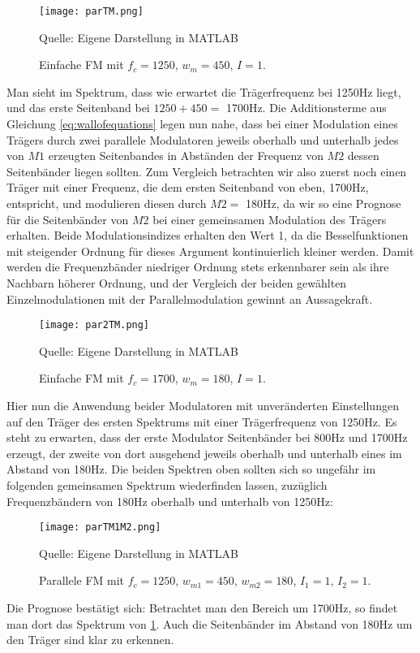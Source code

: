 \FloatBarrier
\begin{figure} [ht]
\centering
  \texttt{[image: parTM.png]}
\caption{Einfache FM mit $f_c = 1250$, $w_m = 450$, $I = 1$. }
Quelle: Eigene Darstellung in MATLAB
\end{figure}
\FloatBarrier
Man sieht im Spektrum, dass wie erwartet die Trägerfrequenz bei 1250Hz liegt, und das erste Seitenband bei $ 1250 + 450 =$ 1700Hz. Die Additionsterme aus Gleichung \ref{eq:wallofequations} legen nun nahe, dass bei einer Modulation eines Trägers durch zwei parallele Modulatoren jeweils oberhalb und unterhalb jedes von $M1$ erzeugten Seitenbandes in Abständen der Frequenz von $M2$ dessen Seitenbänder liegen sollten. Zum Vergleich betrachten wir also zuerst noch einen Träger mit einer Frequenz, die dem ersten Seitenband von eben, 1700Hz, entspricht, und modulieren diesen durch $M2 =$ 180Hz, da wir so eine Prognose für die Seitenbänder von $M2$ bei einer gemeinsamen Modulation des Trägers erhalten. Beide Modulationsindizes erhalten den Wert 1, da die Besselfunktionen mit steigender Ordnung für dieses Argument kontinuierlich kleiner werden. Damit werden die Frequenzbänder niedriger Ordnung stets erkennbarer sein als ihre Nachbarn höherer Ordnung, und der Vergleich der beiden gewählten Einzelmodulationen mit der Parallelmodulation gewinnt an Aussagekraft.
\FloatBarrier
\begin{figure} [ht]
\label{par1}
\centering
  \texttt{[image: par2TM.png]}
\caption{Einfache FM mit $f_c = 1700$, $w_m = 180$, $I = 1$. }
Quelle: Eigene Darstellung in MATLAB
\end{figure}
\FloatBarrier
Hier nun die Anwendung beider Modulatoren mit unveränderten Einstellungen auf den Träger des ersten Spektrums mit einer Trägerfrequenz von 1250Hz. Es steht zu erwarten, dass der erste Modulator Seitenbänder bei 800Hz und 1700Hz erzeugt, der zweite von dort ausgehend jeweils oberhalb und unterhalb eines im Abstand von 180Hz. Die beiden Spektren oben sollten sich so ungefähr im folgenden gemeinsamen Spektrum wiederfinden lassen, zuzüglich Frequenzbändern von 180Hz oberhalb und unterhalb von 1250Hz:
\FloatBarrier
\begin{figure} [ht]
\centering
  \texttt{[image: parTM1M2.png]}
\caption{Parallele FM mit $f_c = 1250$, $w_{m1} = 450$, $w_{m2} = 180$, $I_1 = 1$, $I_2 = 1$. }
Quelle: Eigene Darstellung in MATLAB
\end{figure}
\FloatBarrier
Die Prognose bestätigt sich: Betrachtet man den Bereich um 1700Hz, so findet man dort das Spektrum von \ref{par1}. Auch die Seitenbänder im Abstand von 180Hz um den Träger sind klar zu erkennen.

